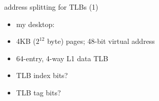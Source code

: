 \begin{frame}{address splitting for TLBs (1)}
\begin{itemize}
\item my desktop:
\item 4KB ($2^{12}$ byte) pages; 48-bit virtual address
\item 64-entry, 4-way L1 data TLB
\vspace{.5cm}
\item TLB index bits?
\iftoggle{heldback}{}{
    \begin{itemize}\item<2->$64/4 = 16$ sets --- 4 bits\end{itemize}
}
\item TLB tag bits?
\iftoggle{heldback}{}{
    \begin{itemize}\item<2->$48-12=36$ bit virtual page number ---  $36-4=32$ bit TLB tag\end{itemize}
}
\end{itemize}
\end{frame}


